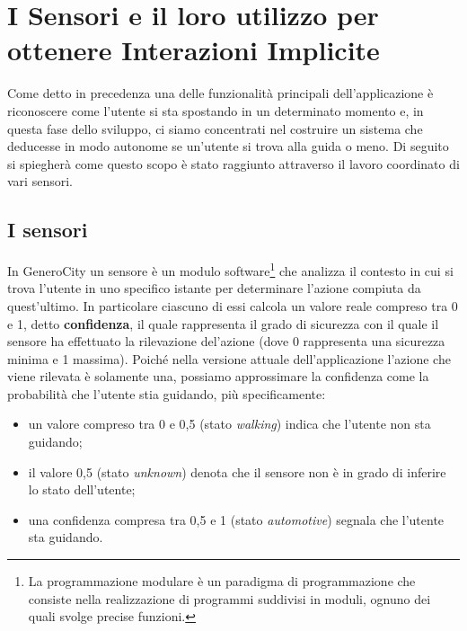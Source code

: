 \chapter{I Sensori e il loro utilizzo per ottenere Interazioni Implicite}

Come detto in precedenza una delle funzionalità principali dell'applicazione è riconoscere come l'utente si sta spostando in un determinato momento e, in questa fase dello sviluppo, ci siamo concentrati nel costruire un sistema che deducesse in modo autonome se un'utente si trova alla guida o meno. Di seguito si spiegherà come questo scopo è stato raggiunto attraverso il lavoro coordinato di vari sensori.


\section{I sensori}
In GeneroCity un sensore è un modulo software\footnote{La programmazione modulare è un paradigma di programmazione che consiste nella realizzazione di programmi suddivisi in moduli, ognuno dei quali svolge precise funzioni.} che analizza il contesto in cui si trova l'utente in uno specifico istante per determinare l'azione compiuta da quest'ultimo. In particolare ciascuno di essi calcola un valore reale compreso tra 0 e 1, detto \textbf{confidenza}, il quale rappresenta il grado di sicurezza con il quale il sensore ha effettuato la rilevazione del'azione (dove 0 rappresenta una sicurezza minima e 1 massima). Poiché nella versione attuale dell'applicazione l'azione che viene rilevata è solamente una, possiamo approssimare la confidenza come la probabilità che l'utente stia guidando, più specificamente:
\begin{itemize}
    \item un valore compreso tra 0 e 0,5 (stato \textit{walking}) indica che l'utente non sta guidando;
    \item il valore 0,5 (stato \textit{unknown}) denota che il sensore non è in grado di inferire lo stato dell'utente;
    \item una confidenza compresa tra 0,5 e 1 (stato \textit{automotive}) segnala che l'utente sta guidando.
\end{itemize}

